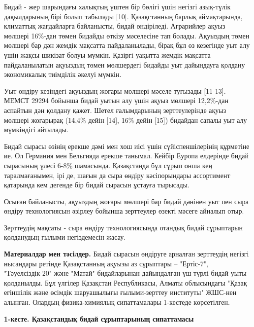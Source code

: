 Бидай - жер шарындағы халықтың үштен бір бөлігі үшін негізгі азық-түлік
дақылдарының бірі болып табылады {[}10{]}. Қазақстанның барлық
аймақтарында, климаттық жағдайларға байланысты, бидай өндіріледі.
Аграрийлер ақуыз мөлшері 16\%-дан төмен бидайды өткізу мәселесіне тап
болады. Ақуыздың төмен мөлшері бар дән жемдік мақсатта пайдаланылады,
бірақ бұл өз кезегінде уыт алу үшін жақсы шикізат болуы мүмкін. Қазіргі
уақытта жемдік мақсатта пайдаланылатын ақуыздың төмен мөлшердегі бидайды
уыт дайындауға қолдану экономикалық тиімділік әкелуі мүмкін.

Уыт өндіру кезіндегі ақуыздың жоғары мөлшері мәселе туғызады
{[}11-13{]}. МЕМСТ 29294 бойынша бидай уытын алу үшін ақуыз мөлшері
12,2\%-дан аспайтын дән қолдану қажет. Шетел ғалымдарының зерттеулерінде
ақуыз мөлшері жоғарырақ (14,4\% дейін {[}14{]}, 16\% дейін {[}15{]})
бидайдан сапалы уыт алу мүмкіндігі айтылады.

Бидай сырасы өзінің ерекше дәмі мен хош иісі үшін сүйіспеншілерінің
құрметіне ие. Ол Германия мен Бельгияда ерекше танымал. Кейбір Еуропа
елдерінде бидай сырасының үлесі 6-8\% шамасында. Қазақстанда бұл сұрып
онша кең таралмағанымен, ірі де, шағын да сыра өндіру кәсіпорындары
ассортимент қатарында кем дегенде бір бидай сырасын ұстауға тырысады.

Осыған байланысты, ақуыздың жоғары мөлшері бар бидай дәнінен уыт пен
сыра өндіру технологиясын әзірлеу бойынша зерттеулер өзекті мәсеге
айналып отыр.

Зерттеудің мақсаты - сыра өндіру технологиясында отандық бидай
сұрыптарын қолданудың ғылыми негіздемесін жасау.

{\bfseries Материалдар мен тәсілдер.} Бидай сырасын өндіруге арналған
зерттеудің негізгі нысандары ретінде Қазақстанның ақуызы аз сұрыптары --
"Ертіс-7", "Тәуелсіздік-20" және "Матай" бидайларынан дайындалған үш
түрлі бидай уыты қолданылды. Бұл үлгілер Қазақстан Республикасы, Алматы
облысындағы "Қазақ егіншілік және өсімдік шаруашылығы ғылыми-зерттеу
институты" ЖШС-нен алынған. Олардың физика-химиялық сипаттамалары
1-кестеде көрсетілген.

{\bfseries 1-кесте. Қазақстандық бидай сұрыптарының сипаттамасы}

